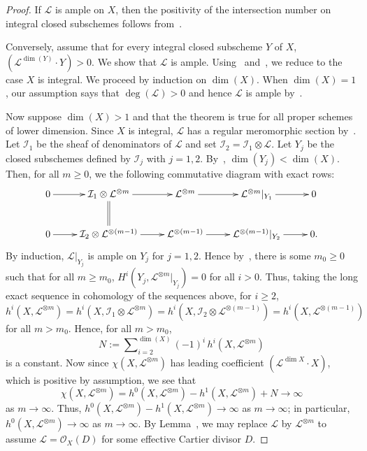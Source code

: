 \begin{proof}
If $\mathcal{L}$ is ample on $X$, then the positivity of the intersection
number on integral closed subschemes follows from~.

Conversely, assume that for every integral closed subscheme $Y$ of $X$,
$(\mathcal{L}^{\dim(Y)} \cdot Y) > 0$.
We show that $\mathcal{L}$ is ample.
Using~ and~, we reduce to the case $X$ is integral.
We proceed by induction on $\dim(X)$.
When $\dim(X) = 1$, our assumption says that $\deg(\mathcal{L}) > 0$ and hence
$\mathcal{L}$ is ample by~.

Now suppose $\dim(X) > 1$ and that the theorem is true for all proper schemes
of lower dimension.
Since $X$ is integral, $\mathcal{L}$ has a regular meromorphic section
by~.
Let $\mathcal{I}_1$ be the sheaf of denominators of $\mathcal{L}$ and set
$\mathcal{I}_2 = \mathcal{I}_1 \otimes \mathcal{L}$.
Let $Y_j$ be the closed subschemes defined by $\mathcal{I}_j$ with $j = 1,2$.
By~, $\dim(Y_j) < \dim(X)$.
Then, for all $m \geq 0$, we the following commutative diagram with exact rows:
$$
\xymatrix{
  0 \ar[r]
    & \mathcal{I}_1 \otimes \mathcal{L}^{\otimes m} \ar[r] \ar@{=}[d]
    & \mathcal{L}^{\otimes m} \ar[r]
    & \mathcal{L}^{\otimes m}\rvert_{Y_1} \ar[r]
    & 0 \\
  0 \ar[r]
    & \mathcal{I}_2 \otimes \mathcal{L}^{\otimes (m-1)} \ar[r]
    & \mathcal{L}^{\otimes (m-1)} \ar[r]
    & \mathcal{L}^{\otimes (m-1)}\rvert_{Y_2} \ar[r]
    & 0.
}
$$
By induction, $\mathcal{L}\rvert_{Y_j}$ is ample on $Y_j$ for $j = 1,2$.
Hence by~, there is some $m_0 \geq 0$
such that for all $m \geq m_0$,
$H^i(Y_j,\mathcal{L}^{\otimes m}\rvert_{Y_j}) = 0$ for all $i > 0$.
Thus, taking the long exact sequence in cohomology of the sequences above,
for $i \geq 2$,
$$
  h^i(X,\mathcal{L}^{\otimes m})
    = h^i(X,\mathcal{I}_1 \otimes \mathcal{L}^{\otimes m})
    = h^i(X,\mathcal{I}_2 \otimes \mathcal{L}^{\otimes (m - 1)})
    = h^i(X,\mathcal{L}^{\otimes (m-1)})
$$
for all $m > m_0$.
Hence, for all $m > m_0$,
$$
N := \sum\nolimits_{i = 2}^{\dim(X)} (-1)^i\,h^i(X,\mathcal{L}^{\otimes m})
$$
is a constant.
Now since $\chi(X,\mathcal{L}^{\otimes m})$ has leading coefficient
$(\mathcal{L}^{\dim X} \cdot X)$, which is positive by assumption,
we see that
$$
  \chi(X,\mathcal{L}^{\otimes m})
    = h^0(X,\mathcal{L}^{\otimes m}) - h^1(X,\mathcal{L}^{\otimes m})
      + N \to \infty
$$
as $m \to \infty$. Thus,
$h^0(X,\mathcal{L}^{\otimes m}) - h^1(X,\mathcal{L}^{\otimes m}) \to \infty$
as $m \to \infty$; in particular,
$h^0(X,\mathcal{L}^{\otimes m}) \to \infty$ as $m \to \infty$.
By Lemma~, we may replace $\mathcal{L}$ by
$\mathcal{L}^{\otimes m}$ to assume $\mathcal{L} = \mathcal{O}_X(D)$ for some
effective Cartier divisor $D$.


\end{proof}
